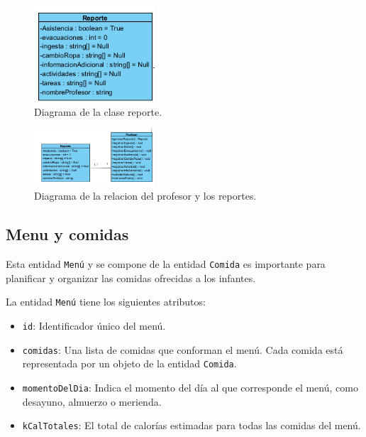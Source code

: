 \begin{figure}[htbp]
\centering
\includegraphics[width=0.4\textwidth]{images/arqui/Reporte.png}
\caption{Diagrama de la clase reporte.}
\label{fig:entidadreporte}
\end{figure}

\begin{figure}[htbp]
\centering
\includegraphics[width=0.4\textwidth]{images/arqui/reprof.png}
\caption{Diagrama de la relacion del profesor y los reportes.}
\label{fig:entidadpadre}
\end{figure}


\clearpage
\subsection{Menu y comidas}


Esta entidad \texttt{Menú} y se compone de la entidad \texttt{Comida} es importante para planificar y organizar las comidas ofrecidas a los infantes.

La entidad \texttt{Menú} tiene los siguientes atributos:

\begin{itemize}
\item \texttt{id}: Identificador único del menú.
\item \texttt{comidas}: Una lista de comidas que conforman el menú. Cada comida está representada por un objeto de la entidad \texttt{Comida}.
\item \texttt{momentoDelDia}: Indica el momento del día al que corresponde el menú, como desayuno, almuerzo o merienda.
\item \texttt{kCalTotales}: El total de calorías estimadas para todas las comidas del menú.
\end{itemize}

